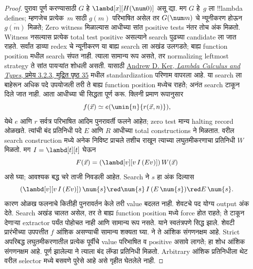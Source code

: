 \documentclass[../../../include/open-logic-section]{subfiles}
\begin{document}
\begin{proof}
पुरावा पूर्ण करण्यासाठी $G$ हे
$\lambd[x][H(\num 0)]$ असू द्या. मग $G$
हे~$g$ ला !!{lambda define}s; म्हणजेच प्रत्येक~$m$
साठी $g(m)$ परिभाषित असेल तर $G(\num m)$ चे
न्यूनीकरण होऊन~$\overline {g(m)}$ मिळते;
Zero witness मिळाल्यास आधीच्या सांत positive tests नंतर
तोच अंक मिळतो. Witness नसल्यास प्रत्येक total test
positive असल्याने search पुढच्या candidate ला जात राहते.
सर्वांत डाव्या redex चे न्यूनीकरण या बाह्य search ला अखंड
उलगडते; बाह्य function position मधील search संपत नाही.
त्याला सामान्य रूप असते, तर normalizing leftmost strategy
ते सांत पायऱ्यांत शोधली असती. यासाठी
\href{https://www.cs.ox.ac.uk/andrew.ker/docs/lambdacalculus-lecture-notes-ht2009.pdf}{Andrew D. Ker, \emph{Lambda Calculus and Types}, प्रमेय 3.2.3,
मुद्रित पृष्ठ 35} मधील standardization परिणाम वापरला आहे.
या search ला बाहेरून अधिक पदे उपयोजली तरी ते बाह्य
function position मध्येच राहते; अनंत search टाकून दिले जात नाही.
आता आधीच्या  ची सिद्धता
पूर्ण करू. क्लिनी प्रमाण रूपानुसार
\[
 f(\vec x)\simeq e(\umin{n}{r(\vec x,n)}),
\]
येथे $e$ आणि $r$ सर्वत्र परिभाषित आदिम पुनरावर्ती फलने
आहेत; zero test मान्य halting record ओळखते. त्यांची बंद
प्रतिनिधी पदे $E$ आणि $R$ आधीच्या total constructions ने
मिळतात. वरील search construction मध्ये अनेक निविष्ट प्राचले
तशीच राखून त्याच्या लघुतमीकरणाचा प्रतिनिधी $W$ मिळतो.
मग $I=\lambd[t][t]$ घेऊन
\[
 F(\vec x)=(\lambd[v][v\,I\,(E v)])\,W(\vec x)
\]
असे घ्या; आवश्यक बद्ध चरे ताजी निवडली आहेत. Search
ने $s$ हा अंक दिल्यास
\[
 (\lambd[v][v\,I\,(E v)])\,\num{s}
 \red \num{s}\,I\,(E\,\num{s})
 \red E\,\num{s}.
\]
कारण ओळख फलनाचे कितीही पुनरावर्तन केले तरी value बदलत
नाही. शेवटचे पद योग्य output अंक देते. Search अखंड चालत
असेल, तर ते बाह्य function position मध्ये force होत राहते;
ते टाकून देणाऱ्या extractor पर्यंत पोहोचत नाही आणि सामान्य
रूप नसते. याने  स्वतंत्रपणे
सिद्ध झाले.
शेवटी प्रारंभीच्या उपपत्तीत $f$ आंशिक असण्याची सामान्य
शक्यता घ्या.  ने ते आंशिक
संगणनक्षम आहे. Strict अपरिबद्ध लघुतमीकरणातील प्रत्येक
पूर्वीचे value परिभाषित व positive असावे लागते; हा शोध
आंशिक संगणनक्षम आहे. पूर्ण झालेल्या
 ने त्याला बंद लॅम्डा
प्रतिनिधी मिळतो. Arbitrary आंशिक प्रतिनिधीला थेट वरील
selector मध्ये बसवणे पुरेसे आहे असे गृहीत घेतलेले नाही.
\end{proof}
\end{document}
